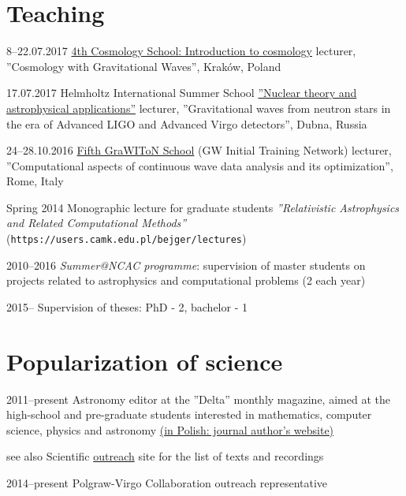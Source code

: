 \documentclass[]{friggeri-cv} %
\begin{document}
\section{Teaching}
\begin{entrylistshort}

\entrys
{8--22.07.2017}
{\href{http://cosmoschool2018.oa.uj.edu.pl}{4th Cosmology School: Introduction to cosmology} lecturer, ''Cosmology with Gravitational Waves'', Kraków, Poland}

\entrys
{17.07.2017} 
{Helmholtz International Summer School \href{http://theor.jinr.ru/~ntaa/17}{''Nuclear theory and astrophysical applications''} lecturer, ''Gravitational waves from neutron stars in the era of Advanced LIGO and Advanced Virgo detectors'', Dubna, Russia}  

\entrys
{24--28.10.2016}
{\href{https://events.ego-gw.it/indico/conferenceDisplay.py?ovw=True\&confId=44}{Fifth GraWIToN School} (GW Initial Training Network) lecturer, ''Computational aspects of continuous wave data analysis and its optimization'', Rome, Italy}

\entrys
{Spring 2014}
{Monographic lecture for graduate students {\it ''Relativistic Astrophysics and Related Computational Methods''} ({\tt https://users.camk.edu.pl/bejger/lectures})} 

\entrys
{2010--2016} 
{{\it Summer@NCAC programme}: supervision of master students on projects related to astrophysics and computational problems (2 each year)} 

\entrys
{2015--} 
{Supervision of theses: PhD - 2, bachelor - 1} 
\end{entrylistshort}


\pagebreak 

\section{Popularization of science}
\begin{entrylistshort}

\entrys 
{2011--present} 
{Astronomy editor at the ''Delta'' monthly magazine, aimed at the high-school and pre-graduate students interested in mathematics, computer science, physics and astronomy \href{http://www.deltami.edu.pl/delta/autorzy/michal\_bejger}{(in Polish: journal author's website)}} 

\entrys
{see also} 
{Scientific \href{http://users.camk.edu.pl/bejger/outreach/}{outreach} site for the list of texts and recordings} 

\entrys
{2014--present} 
{Polgraw-Virgo Collaboration outreach representative} 
\end{entrylistshort}
\end{document}
